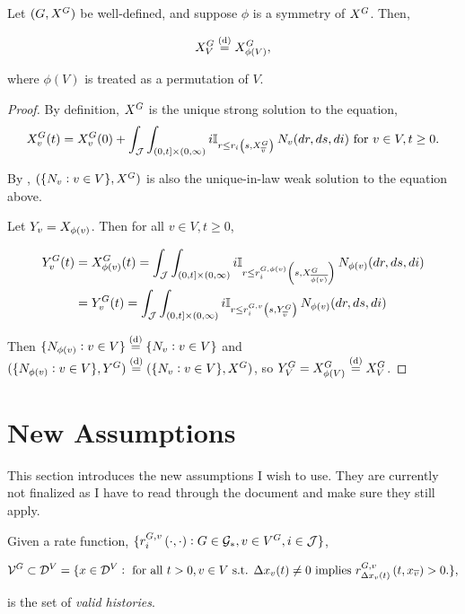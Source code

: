 \begin{prop}
Let \((G,X^{G})\) be well-defined, and suppose \(\phi\) is a symmetry of \(X^{G}\). Then,

\[X^{G}_{V} \overset{\text{(d)}}{=} X^{G}_{\phi(V)},\]

where \(\phi(V)\) is treated as a permutation of \(V\).
\label{a::simprop}
\end{prop}
\begin{proof}
By definition, \(X^{G}\) is the unique strong solution to the equation,
\[\Xf\gind{G}\vind{v}\tme{t} = \Xf\gind{G}\vind{v}\tme{0} + \int_\jmps\int_{(0,t]\times(0,\infty)} i\mb{I}_{r \leq \rate\stpara{i}\tmepro{s}{\Xf\gind{G}\vind{\cl{v}}}{}}\,\poiss\poissv{v}(dr,ds,di) \te{ for } v \in V, t \geq 0.\]

By \cite[Proposition 2.10]{Kur07}, \((\{N_{v}:v\in V\},X^{G})\) is also the unique-in-law weak solution to the equation above.

\ind Let \(Y_{v} = X_{\phi(v)}\). Then for all \(v\in V,t\geq 0\),

\begin{align*}
\Xg\gind{G}\vind{v}\tme{t} &= \Xf\gind{G}\vind{\phi(v)}\tme{t} = \int_\jmps\int_{(0,t]\times(0,\infty)} i\mb{I}_{r \leq \rate\gvpara{G}{\phi(v)}\stpara{i}\tmepro{s}{\Xf\gind{G}\vind{\cl{\phi(v)}}}{}}\,\poiss\poissv{\phi(v)}(dr,ds,di)\\
&= \Xg\gind{G}\vind{v}\tme{t} = \int_\jmps\int_{(0,t]\times(0,\infty)} i\mb{I}_{r \leq \rate\gvpara{G}{v}\stpara{i}\tmepro{s}{\Xg\gind{G}\vind{\cl{v}}}{}}\,\poiss\poissv{\phi(v)}(dr,ds,di)\\
\end{align*}

Then \(\{N_{\phi(v)}:v \in V\} \overset{\text{(d)}}{=} \{N_{v}:v\in V\}\) and \((\{N_{\phi(v)}:v \in V\},Y^{G}) \overset{\text{(d)}}{=} (\{N_{v}:v \in V\},X^{G})\), so \(Y^{G}_{V} = X^{G}_{\phi(V)} \overset{\text{(d)}}{=} X^{G}_{V}\).
\end{proof}

\section{New Assumptions}
\label{na}

This section introduces the new assumptions I wish to use. They are currently not finalized as I have to read through the document and make sure they still apply. 

\begin{defn}
\label{na::valid}
Given a rate function, \(\{\rate\gvpara{G}{v}\stpara{i}\tmepro{\cdot}{\cdot}{}:G \in \Gs,v \in V\gind{G}, i \in \jmps\}\),

\[\valid\gind{G} \subset \cad\vpara{V} = \{\xf \in \cad\vpara{V}: \te{ for all }t>0,v\in V\te{ s.t. } \Delta \xf\vind{v}\tme{t} \neq 0 \te{ implies } \rate\gvpara{G}{v}\stpara{\Delta\xf\vind{v}\tme{t}}\tmepro{t}{\xf\vind{\cl{v}}}{} > 0.\},\]

is the set of \emph{valid histories}.
\end{defn}

